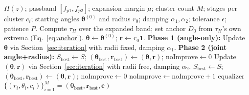 \documentclass[11pt]{article}
\begin{document}
\begin{algorithm}[h]
\caption{Anchored equi-ripple group-delay equalization}
\begin{algorithmic}[1]
\Require $H(z)$; passband $[f_{p1},f_{p2}]$; expansion margin $\mu$;
  cluster count $M$; stages per cluster $c_i$; starting angles
  $\boldsymbol\theta^{(0)}$ and radius $r_0$; damping $\alpha_1,\alpha_2$;
  tolerance $\epsilon$; patience $P$.
\State Compute $\tau_H$ over the expanded band; set anchor $D_0$ from
  $\tau_H$'s own extrema (Eq.~\ref{eq:anchor}).
\State $\boldsymbol\theta \gets \boldsymbol\theta^{(0)}$; \quad
  $\mathbf r \gets r_0\mathbf 1$.
\Statex \textbf{Phase 1 (angle-only):}
\Repeat
  \State Update $\boldsymbol\theta$ via Section~\ref{sec:iteration} with
    radii fixed, damping $\alpha_1$.
\Statex \textbf{Phase 2 (joint angle+radius):}
\State $S_{\text{best}} \gets S$; \quad $(\boldsymbol\theta_{\text{best}}, \mathbf r_{\text{best}}) \gets (\boldsymbol\theta, \mathbf r)$; \quad $\text{noImprove} \gets 0$
\Repeat
  \State Update $(\boldsymbol\theta,\mathbf r)$ via
    Section~\ref{sec:iteration} with radii free, damping $\alpha_2$.
    \State $S_{\text{best}} \gets S$; \quad $(\boldsymbol\theta_{\text{best}}, \mathbf r_{\text{best}}) \gets (\boldsymbol\theta, \mathbf r)$; \quad $\text{noImprove} \gets 0$
  \Else
    \State $\text{noImprove} \gets \text{noImprove} + 1$
  \EndIf
{}
\State \Return equalizer $\{(r_i,\theta_i,c_i)\}_{i=1}^M = (\boldsymbol\theta_{\text{best}}, \mathbf r_{\text{best}}, \mathbf c)$
\end{algorithmic}
\end{algorithm}
\end{document}
